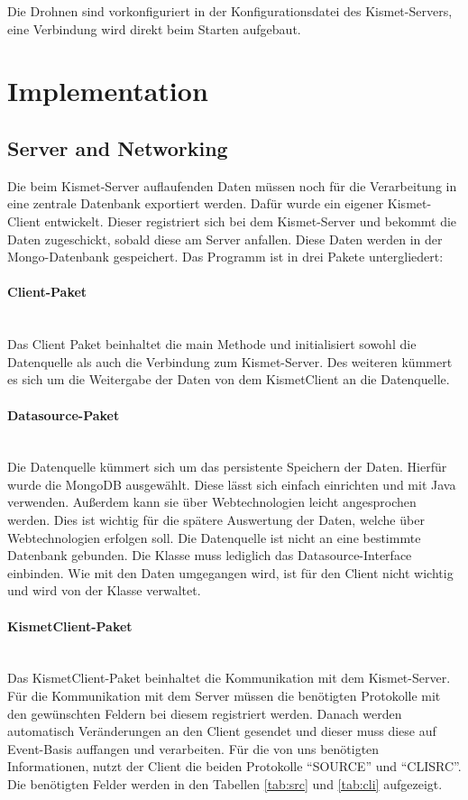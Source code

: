 \documentclass[a4paper]{spie}  %
\begin{document}
Die Drohnen sind vorkonfiguriert in der Konfigurationsdatei des Kismet-Servers, eine Verbindung wird direkt beim Starten aufgebaut.
\section{Implementation}
\subsection{Server and Networking}
Die beim Kismet-Server auflaufenden Daten müssen noch für die Verarbeitung in eine zentrale Datenbank exportiert werden. Dafür wurde ein eigener Kismet-Client entwickelt. Dieser registriert sich bei dem Kismet-Server und bekommt die Daten zugeschickt, sobald diese am Server anfallen. Diese Daten werden in der Mongo-Datenbank gespeichert. Das Programm ist in drei Pakete untergliedert:

\paragraph{Client-Paket}\mbox{}\\
Das Client Paket beinhaltet die main Methode und initialisiert sowohl die Datenquelle als auch die Verbindung zum Kismet-Server. Des weiteren kümmert es sich um die Weitergabe der Daten von dem KismetClient an die Datenquelle.

\paragraph{Datasource-Paket}\mbox{}\\
Die Datenquelle kümmert sich um das persistente Speichern der Daten. Hierfür wurde die MongoDB ausgewählt. Diese lässt sich einfach einrichten und mit Java verwenden. Außerdem kann sie über Webtechnologien leicht angesprochen werden. Dies ist wichtig für die  spätere Auswertung der Daten, welche über Webtechnologien erfolgen soll. Die Datenquelle ist nicht an eine bestimmte Datenbank gebunden. Die Klasse muss lediglich das Datasource-Interface einbinden. Wie mit den Daten umgegangen wird, ist für den Client nicht wichtig und wird von der Klasse verwaltet. 

\paragraph{KismetClient-Paket}\mbox{}\\
Das KismetClient-Paket beinhaltet die Kommunikation mit dem Kismet-Server. Für die Kommunikation mit dem Server müssen die benötigten Protokolle mit den gewünschten Feldern bei diesem registriert werden. Danach werden automatisch Veränderungen an den Client gesendet und dieser muss diese auf Event-Basis auffangen und verarbeiten. Für die von uns benötigten Informationen, nutzt der Client die beiden Protokolle \enquote{SOURCE} und \enquote{CLISRC}. Die benötigten Felder werden in den Tabellen \ref{tab:src} und \ref{tab:cli} aufgezeigt.
\end{document}
